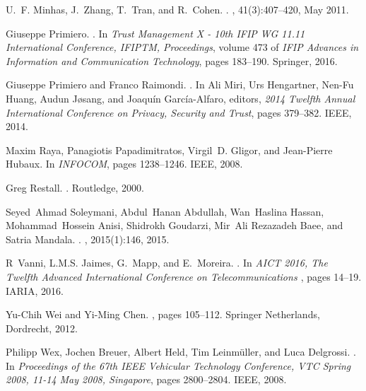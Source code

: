 \documentclass[compsoc, conference, letterpaper, 10pt, times]{IEEEtran}
\begin{document}
\begin{thebibliography}{10}
U.~F. Minhas, J.~Zhang, T.~Tran, and R.~Cohen.
.
, 41(3):407--420, May 2011.

Giuseppe Primiero.
.
\newblock In {\em {Trust Management {X} - 10th {IFIP} {WG}
  11.11 International Conference, {IFIPTM}, Proceedings}}, volume 473 of {\em {{IFIP} Advances in
  Information and Communication Technology}}, pages 183--190. Springer, 2016.

Giuseppe Primiero and Franco Raimondi.
.
\newblock In Ali Miri, Urs Hengartner, Nen{-}Fu Huang, Audun J{\o}sang, and
  Joaqu{\'i}n Garc{\'i}a{-}Alfaro, editors, {\em {2014 Twelfth Annual
  International Conference on Privacy, Security and Trust}}, pages 379--382. {IEEE}, 2014.

Maxim Raya, Panagiotis Papadimitratos, Virgil~D. Gligor, and Jean-Pierre
  Hubaux.
\newblock In {\em {INFOCOM}}, pages 1238--1246. IEEE, 2008.

Greg Restall.
.
\newblock Routledge, 2000.

Seyed~Ahmad Soleymani, Abdul~Hanan Abdullah, Wan~Haslina Hassan,
  Mohammad~Hossein Anisi, Shidrokh Goudarzi, Mir~Ali {Rezazadeh Baee}, and
  Satria Mandala.
.
,
  2015(1):146, 2015.

R~Vanni, L.M.S. Jaimes, G.~Mapp, and E.~Moreira.
.
\newblock In {\em {AICT 2016, The Twelfth Advanced International Conference on
  Telecommunications }}, pages 14--19. IARIA, 2016.

Yu-Chih Wei and Yi-Ming Chen.
, pages 105--112.
\newblock Springer Netherlands, Dordrecht, 2012.

Philipp Wex, Jochen Breuer, Albert Held, Tim Leinm{\"u}ller, and Luca
  Delgrossi.
.
\newblock In {\em {Proceedings of the 67th {IEEE} Vehicular Technology
  Conference, {VTC} Spring 2008, 11-14 May 2008, Singapore}}, pages 2800--2804.
  {IEEE}, 2008.

\end{thebibliography}
\end{document}
